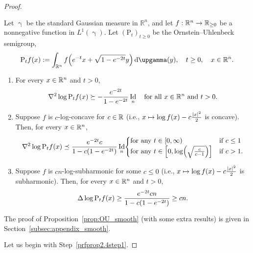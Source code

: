 \documentclass[10pt]{amsart}
\theoremstyle{definition}\newtheorem{defi}[theo]{Definition}\newtheorem{rema}[theo]{Remark}\newtheorem{exam}[theo]{Example}\newtheorem{exem}[theo]{Example}\newtheorem{nota}[theo]{Notation}
\newcommand{\R}{\mathbb R}
\DeclareMathOperator{\Id}{Id}
\newcommand{\Pheat}{\mathrm{P}}
\newcommand{\dd}{n}
\newcommand{\conv}{c}
\newcommand{\density}{f}
\newcommand*\diff{\mathop{}\!\mathrm{d}}
\newcommand{\Gaussian}{\upgamma}
\renewcommand*{\to}{\mathchoice{\longrightarrow}{\rightarrow}{\rightarrow}{\rightarrow}}
\let\oldmapsto\mapsto
\renewcommand*{\mapsto}{\mathchoice{\longmapsto}{\oldmapsto}{\oldmapsto}{\oldmapsto}}
\let\originalleft\left
\let\originalright\right
\renewcommand{\left}{\mathopen{}\mathclose\bgroup\originalleft}
\renewcommand{\right}{\aftergroup\egroup\originalright}
\let\oldin\in
\renewcommand{\in}{\mathchoice{\oldin}{\oldin}{\,\oldin\,}{\,\oldin\,}}
\newcounter{setofstep}
\newcounter{step}[setofstep]
\newcommand*{\relabel}{\renewcommand{\labelenumi}{(\theenumi)}}
\newcommand*{\romanenumi}{\renewcommand*{\theenumi}{\roman{enumi}}\relabel}
\begin{document}
\begin{proof}
\begin{prop}\label{prop:OU_smooth}
Let $\Gaussian$ be the standard Gaussian measure in $\R^{\dd}$, and let $f:\R^{\dd}\to \R_{\ge 0}$ be a nonnegative function in $L^1(\Gaussian)$. Let $(\Pheat_t)_{t\ge 0}$ be the Ornstein--Uhlenbeck semigroup,
\begin{equation}\label{eq:OU_def_prop}
\Pheat_t\density(x):=\int_{\R^{\dd}} \density\left(e^{-t}x+\sqrt{1-e^{-2t}}y\right)\diff \Gaussian(y),\quad t\ge 0,\quad x\in \R^{\dd}.
\end{equation}
\begin{enumerate}\romanenumi
\item\label{prop2.4.1} For every $x\in \R^{\dd}$ and $t>0$,
\begin{equation}\label{eq:less_lc}
\nabla^2\log\Pheat_t\density(x) \succeq -\frac{e^{-2t}}{1-e^{-2t}} \Id_{\dd}\quad \textnormal{for all }x\in\R^{\dd} \text{ and }t>0.
\end{equation}
\item\label{prop2.4.2} Suppose $\density$ is $\conv$-log-concave for $\conv\in \R$ (i.e., $x\mapsto \log \density(x)-\conv\frac{|x|^2}{2}$ is concave). Then, for every $x\in \R^{\dd}$,
\begin{equation}\label{eq:lc_OU}
\nabla^2\log\Pheat_t\density(x)\preceq \frac{ e^{-2t}\conv}{1-\conv(1-e^{-2t})} \Id_{\dd}
\begin{cases}
\text{for any }t\in [0,\infty) &\text{if }\conv\le 1\\
\text{for any }t\in \left[0,\log\left(\sqrt{\frac{\conv}{\conv-1}}\right)\right] &\text{if }\conv >1.
\end{cases}
\end{equation}
\item\label{prop2.4.3} Suppose $\density$ is $\conv\dd$-log-subharmonic for some $\conv\le 0$ (i.e., $x\mapsto \log f(x)-\conv\frac{|x|^2}{2}$ is subharmonic). Then, for every $x\in \R^{\dd}$ and $t>0$,
\begin{equation}\label{eq:beta_subharmonic}
\Delta\log\Pheat_t\density(x)\ge \frac{e^{-2t}\conv\dd}{1-\conv\left(1-e^{-2t}\right)}\ge \conv\dd.
\end{equation}
\end{enumerate}
\end{prop}

The proof of Proposition~\ref{prop:OU_smooth} (with some extra results) is given in Section~\ref{subsec:appendix_smooth}.


Let us begin with Step~\ref{prfprop2.4step1}.


\end{proof}
\end{document}
